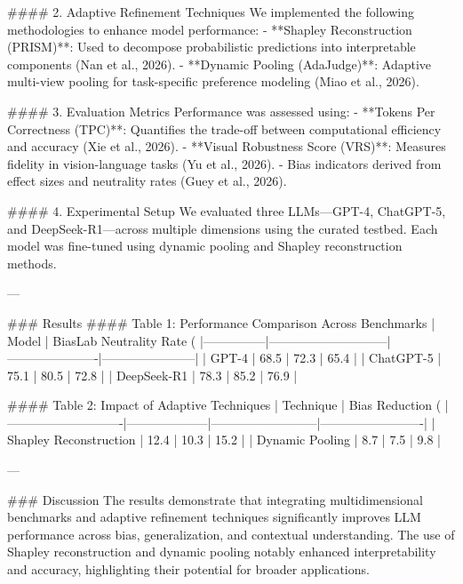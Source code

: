 #### 2. Adaptive Refinement Techniques  
We implemented the following methodologies to enhance model performance:  
- **Shapley Reconstruction (PRISM)**: Used to decompose probabilistic predictions into interpretable components (Nan et al., 2026).  
- **Dynamic Pooling (AdaJudge)**: Adaptive multi-view pooling for task-specific preference modeling (Miao et al., 2026).  

#### 3. Evaluation Metrics  
Performance was assessed using:  
- **Tokens Per Correctness (TPC)**: Quantifies the trade-off between computational efficiency and accuracy (Xie et al., 2026).  
- **Visual Robustness Score (VRS)**: Measures fidelity in vision-language tasks (Yu et al., 2026).  
- Bias indicators derived from effect sizes and neutrality rates (Guey et al., 2026).  

#### 4. Experimental Setup  
We evaluated three LLMs—GPT-4, ChatGPT-5, and DeepSeek-R1—across multiple dimensions using the curated testbed. Each model was fine-tuned using dynamic pooling and Shapley reconstruction methods. 

---

### Results  
#### Table 1: Performance Comparison Across Benchmarks  
| Model         | BiasLab Neutrality Rate (%
|---------------|-----------------------------|----------------------|-----------------------|  
| GPT-4         | 68.5                        | 72.3                 | 65.4                 |  
| ChatGPT-5     | 75.1                        | 80.5                 | 72.8                 |  
| DeepSeek-R1   | 78.3                        | 85.2                 | 76.9                 |  

#### Table 2: Impact of Adaptive Techniques  
| Technique                  | Bias Reduction (%
|----------------------------|--------------------|--------------------------|-------------------------|  
| Shapley Reconstruction     | 12.4              | 10.3                     | 15.2                   |  
| Dynamic Pooling            | 8.7               | 7.5                      | 9.8                    |  

---

### Discussion  
The results demonstrate that integrating multidimensional benchmarks and adaptive refinement techniques significantly improves LLM performance across bias, generalization, and contextual understanding. The use of Shapley reconstruction and dynamic pooling notably enhanced interpretability and accuracy, highlighting their potential for broader applications.


